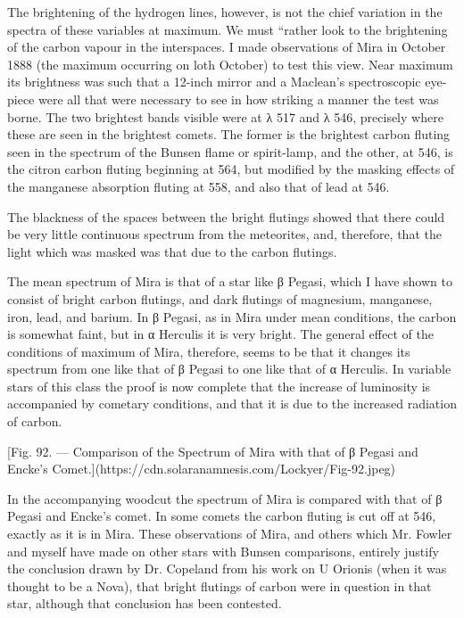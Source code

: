 \documentclass[a4paper, 12pt, oneside, polutonikogreek, english]{article}
\begin{document}
The brightening of the hydrogen lines, however, is not the chief variation in the spectra of these variables at maximum. We must ``rather look to the brightening of the carbon vapour in the interspaces. I made observations of Mira in October 1888 (the maximum occurring on loth October) to test this view. Near maximum its brightness was such that a 12-inch mirror and a Maclean's spectroscopic eye-piece were all that were necessary to see in how striking a manner the test was borne. The two brightest bands visible were at λ 517 and	λ 546, precisely where these are seen in the brightest comets. The former is the brightest carbon fluting seen in the spectrum of the Bunsen flame or spirit-lamp, and the other, at 546, is the citron carbon fluting beginning at 564, but modified by the masking effects of the manganese absorption fluting at 558, and also that of lead at 546.

The blackness of the spaces between the bright flutings showed that there could be very little continuous spectrum from the meteorites, and, therefore, that the light which was masked was that due to the carbon flutings.

The mean spectrum of Mira is that of a star like β Pegasi, which I have shown to consist of bright carbon flutings, and dark flutings of magnesium, manganese, iron, lead, and barium. In β Pegasi, as in Mira under mean conditions, the carbon is somewhat faint, but in α Herculis it is very bright. The general effect of the conditions of maximum of Mira, therefore, seems to be that it changes its spectrum from one like that of β Pegasi to one like that of α Herculis. In variable stars of this class the proof is now complete that the increase of luminosity is accompanied by cometary conditions, and that it is due to the increased radiation of carbon.

[Fig. 92. --- Comparison of the Spectrum of Mira with that of β Pegasi and Encke's Comet.](https://cdn.solaranamnesis.com/Lockyer/Fig-92.jpeg)

In the accompanying woodcut the spectrum of Mira is compared with that of β Pegasi and Encke's comet. In some comets the carbon fluting is cut off at 546, exactly as it is in Mira. These observations of Mira, and others which Mr. Fowler and myself have made on other stars with Bunsen comparisons, entirely justify the conclusion drawn by Dr. Copeland from his work on U Orionis (when it was thought to be a Nova), that bright flutings of carbon were in question in that star, although that conclusion has been contested.
\end{document}
